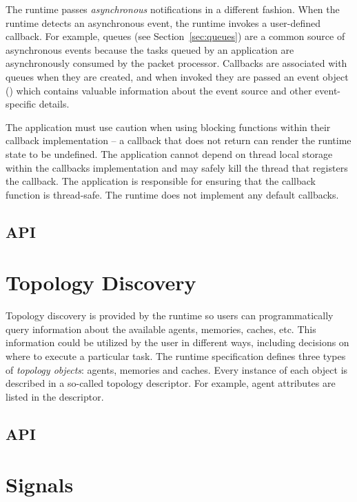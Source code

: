 \documentclass[final]{book}
\begin{document}
The runtime passes \textit{asynchronous} notifications in a different 
fashion. When the runtime detects an asynchronous event, the runtime invokes a
user-defined callback. For example, queues (see Section~\ref{sec:queues}) are a 
common source of asynchronous events because the 
tasks queued by an application are asynchronously consumed by the packet
processor. Callbacks are associated with queues when they are created, and when
invoked they are passed an event object () which contains
valuable information about the event source and other event-specific details.

The application must use caution when using blocking functions within their
callback implementation -- a callback that does not return can render the
runtime state to be undefined. The application cannot depend on thread local
storage within the callbacks implementation and may safely kill the thread that
registers the callback. The application is responsible for ensuring that
the callback function is thread-safe. The runtime does not implement any default
callbacks.

\subsection{API}


\hypertarget{component}{}\section{Topology Discovery}
\label{sec:topology}

Topology discovery is provided by the runtime so users can programmatically
query information about the available agents, memories, caches, etc. This
information could be utilized by the user in different ways, including decisions
on where to execute a particular task. The runtime specification defines three
types of \textit{topology objects}: agents, memories and caches. Every instance
of each object is described in a so-called topology descriptor. For example,
agent attributes are listed in the  descriptor.

\subsection{API}


\section{Signals}\label{sec:signals}
\end{document}
